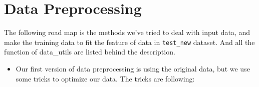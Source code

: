 \documentclass[12pt]{article}
\begin{document}
\section{Data Preprocessing}
The following road map is the methods we've tried to deal with input data, and make the training data to fit the feature of data in \texttt{test\_new} dataset. And all the function of data\_utils are listed behind the description.
\begin{itemize}
	\item Our first version of data preprocessing is using the original data, but we use some tricks to optimize our data. The tricks are following:
\end{itemize}
\end{document}
